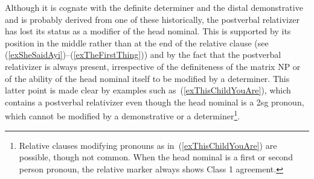 \documentclass[10pt,twoside]{article}
\newcommand{\pref}[1]{(\ref{#1})}
\newcommand{\rref}[2]{\pref{#1}--\pref{#2}}
\begin{document}
Although it is cognate with the definite determiner and the distal demonstrative and is probably 
derived from one of these historically, the postverbal relativizer has lost its status as a 
modifier of the head nominal. This is supported by its position in the middle rather than at 
the end of the relative clause (see \rref{exSheSaidAyi}{exTheFirstThing}) and by the 
fact that the postverbal relativizer is always present, irrespective of the definiteness of the 
matrix NP or of the ability of the head nominal itself to be modified by a determiner.
This latter point is made clear by examples such as~\pref{exThisChildYouAre}, which contains  
a postverbal relativizer even though 
the head nominal is a {\sc 2sg} pronoun, which cannot be modified by a demonstrative or a determiner\footnote{Relative clauses modifying pronouns as in~\pref{exThisChildYouAre} are possible, though not common. When the head nominal is a first or second person pronoun, the relative marker always shows Class 1 agreement.}. 
%
%
\end{document}
